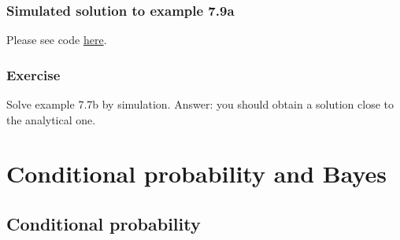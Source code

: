 \begin{frame}[fragile]
    \frametitle{Simulated solution to example 7.9a}

    Please see code \href{https://joacorapela.github.io/gcnuBridging2023/auto_examples/foundations/plot_example7_9a.html#sphx-glr-auto-examples-foundations-plot-example7-9a-py}{here}.

\end{frame}

\begin{frame}
    \frametitle{Exercise}

    Solve example 7.7b by simulation. Answer: you should obtain a solution
    close to the analytical one.

\end{frame}

\begin{comment}
\begin{frame}
    \frametitle{Example:}

    - example 7.10 (rule 7-1, birthday problem, used in example 8.6): uses counting tools (binomial coefficient)

\end{frame}
\end{comment}

\section{Conditional probability and Bayes}

\subsection{Conditional probability}

